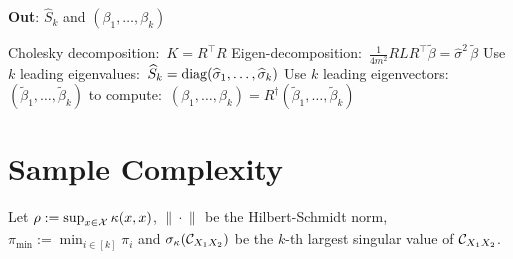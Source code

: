 \documentclass{article}
\newcommand{\Le}[1]{{\color{red}{\bf\sf [note: #1]}}}
\begin{document}
\begin{algorithm}[t!]
\caption{\Le{Overall algorithm with Gram matrix}}
	\textbf{Out}: $\widehat S_k$ and $(\beta_1,\ldots,\beta_k)$\\[-0.4cm]
  \begin{algorithmic}[1]
    \STATE Cholesky decomposition:\ $K=R^\top R$
    \STATE Eigen-decomposition:\ $\frac{1}{4m^2} R L R^\top \widetilde{\beta} = \widehat \sigma^2\,\widetilde{\beta}$
    \STATE Use $k$ leading eigenvalues:\ $\widehat S_k = \mathop{\mathrm{diag}}(\widehat \sigma_1,\ldots,\widehat \sigma_k)$
    \STATE Use $k$ leading eigenvectors:\ $(\widetilde{\beta}_1,\ldots,\widetilde{\beta}_k)$ to
    compute:\ $(\beta_1,\ldots,\beta_k) = R^\dagger (\widetilde{\beta}_1,\ldots,\widetilde{\beta}_k)$
  \end{algorithmic}
  \label{alg:svd}
\end{algorithm}

\vspace{-3mm}
\section{Sample Complexity}
\vspace{-3mm}

Let $\rho:=\sup_{x \in \mathcal{X}} \kappa(x,x)$,   $\| \cdot\|_{}$ be the Hilbert-Schmidt norm, $\pi_{\min}:=\min_{i\in [k]} \pi_i$ and $\sigma_\kappa(\mathcal{C}_{X_1X_2})$ be the $k$-th largest singular value of $\mathcal{C}_{X_1X_2}$.
\end{document}
